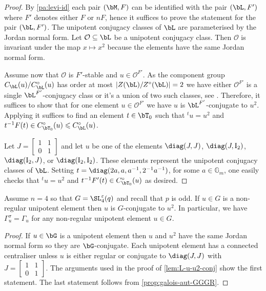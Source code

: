 \documentclass[eqthmnum, nocolour]{jt-calcs}
\begin{document}
\begin{proof}
By \cref{pa:levi-id} each pair $(\bM,F)$ can be identified with the pair $(\bL,F')$ where $F'$ denotes either $F$ or $nF$, hence it suffices to prove the statement for the pair $(\bL,F')$. The unipotent conjugacy classes of $\bL$ are parameterised by the Jordan normal form. Let $\mathcal{O} \subseteq \bL$ be a unipotent conjugacy class. Then $\mathcal{O}$ is invariant under the map $x \mapsto x^2$ because the elements have the same Jordan normal form.

Assume now that $\mathcal{O}$ is $F'$-stable and $u \in \mathcal{O}^{F'}$. As the component group $C_{\bL}(u)/C_{\bL}^{\circ}(u)$ has order at most $|Z(\bL)/Z^{\circ}(\bL)|=2$ we have either $\mathcal{O}^{F'}$ is a single $\bL^{F'}$-conjugacy class or it's a union of two such classes, see \cite[4.3.5]{geck:2003:intro-to-algebraic-geometry}. Therefore, it suffices to show that for one element $u \in \mathcal{O}^{F'}$ we have $u$ is $\bL^{F'}$-conjugate to $u^2$. Applying \cite[4.3.5]{geck:2003:intro-to-algebraic-geometry} it suffices to find an element $t \in \bT_0$ such that ${}^tu = u^2$ and $t^{-1}F(t) \in C_{\bT_0}^{\circ}(u) \leqslant C_{\bL}^{\circ}(u)$.

Let $J = \left[\begin{smallmatrix} 1 & 1\\0 & 1 \end{smallmatrix}\right]$ and let $u$ be one of the elements $\diag(J,J)$, $\diag(J,\mathrm{I}_2)$, $\diag(\mathrm{I}_2,J)$, or $\diag(\mathrm{I}_2,\mathrm{I}_2)$. These elements represent the unipotent conjugacy classes of $\bL$. Setting $t = \diag(2a,a,a^{-1},2^{-1}a^{-1})$, for some $a \in \mathbb{G}_m$, one easily checks that ${}^tu = u^2$ and $t^{-1}F'(t) \in C_{\bT_0}^{\circ}(u)$ as desired.
\end{proof}

\begin{lem}\label{lem:SL4-GGGRs}
Assume $n=4$ so that $G = \SL_4^{\varepsilon}(q)$ and recall that $p$ is odd. If $u \in G$ is a non-regular unipotent element then $u$ is $G$-conjugate to $u^2$. In particular, we have $\Gamma_u^{\sigma} = \Gamma_u$ for any non-regular unipotent element $u \in G$.
\end{lem}

\begin{proof}
If $u \in \bG$ is a unipotent element then $u$ and $u^2$ have the same Jordan normal form so they are $\bG$-conjugate. Each unipotent element has a connected centraliser unless $u$ is either regular or conjugate to $\diag(J,J)$ with $J = \left[\begin{smallmatrix} 1 & 1\\0 & 1 \end{smallmatrix}\right]$. The arguments used in the proof of \cref{lem:L-u-u2-conj} show the first statement. The last statement follows from \cref{prop:galois-aut-GGGR}.
\end{proof}
\end{document}
